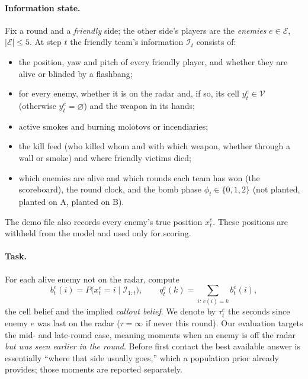 \documentclass[11pt]{article}
\newcommand{\1}{\mathbb{1}}
\begin{document}
\paragraph{Information state.} Fix a round and a \emph{friendly} side; the other side's players are the \emph{enemies} $e \in \mathcal{E}$, $|\mathcal{E}| \le 5$. At step $t$ the friendly team's information $\mathcal{I}_t$ consists of:
\begin{itemize}
  \item the position, yaw and pitch of every friendly player, and whether they are alive or blinded by a flashbang;
  \item for every enemy, whether it is on the radar and, if so, its cell $y^e_t \in \mathcal{V}$ (otherwise $y^e_t = \varnothing$) and the weapon in its hands;
  \item active smokes and burning molotovs or incendiaries;
  \item the kill feed (who killed whom and with which weapon, whether through a wall or smoke) and where friendly victims died;
  \item which enemies are alive and which rounds each team has won (the scoreboard), the round clock, and the bomb phase $\phi_t \in \{0, 1, 2\}$ (not planted, planted on A, planted on B).
\end{itemize}
The demo file also records every enemy's true position $x^e_t$. These positions are withheld from the model and used only for scoring.

\paragraph{Task.} For each alive enemy not on the radar, compute
\begin{equation}
  b^e_t(i) = P\big(x^e_t = i \mid \mathcal{I}_{1:t}\big), \qquad q^e_t(k) = \sum_{i:\, c(i) = k} b^e_t(i),
\end{equation}
the cell belief and the implied \emph{callout belief}. We denote by $\tau^e_t$ the seconds since enemy $e$ was last on the radar ($\tau = \infty$ if never this round). Our evaluation targets the mid- and late-round case, meaning moments when an enemy is off the radar \emph{but was seen earlier in the round}. Before first contact the best available answer is essentially ``where that side usually goes,'' which a population prior already provides; those moments are reported separately.
\end{document}
